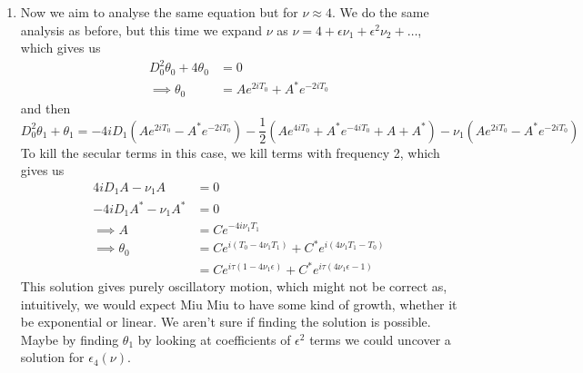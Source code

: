 \documentclass[12pt]{article}
\begin{document}
\begin{enumerate}
\begin{enumerate}
            \item Now we aim to analyse the same equation but for $\nu \approx 4$. We do the same 
            analysis as before, but this time we expand $\nu$ as $\nu = 4 + \epsilon\nu_1 + 
            \epsilon^2 \nu_2 + \dots$, which gives us
            \begin{equation*}
                \begin{split}
                    D_0^2\theta_0 + 4\theta_0 &= 0 \\
                    \implies \theta_0 &= Ae^{2iT_0}+A^*e^{-2iT_0}
                \end{split}
            \end{equation*}
            and then 
            \begin{equation*}
                D_0^2 \theta_1 +\theta_1 = -4iD_1(Ae^{2iT_0}-A^*e^{-2iT_0})-\frac{1}{2}(Ae^{4iT_0}
                +A^*e^{-4iT_0}+A+A^*)-\nu_1(Ae^{2iT_0}-A^*e^{-2iT_0})
            \end{equation*}
            To kill the secular terms in this case, we kill terms with frequency 2, which gives us 
            \begin{equation*}
                \begin{split}
                    4iD_1A-\nu_1A&=0 \\
                    -4iD_1A^*-\nu_1A^*&=0 \\
                    \implies A&=Ce^{-4i\nu_1T_1} \\
                    \implies \theta_0 &= Ce^{i(T_0-4\nu_1T_1)}+C^*e^{i(4\nu_1T_1-T_0)} \\
                    &= Ce^{i\tau(1-4\nu_1\epsilon)}+C^*e^{i\tau(4\nu_1\epsilon-1)}
                \end{split}
            \end{equation*}
            This solution gives purely oscillatory motion, which might not be correct as, intuitively, 
            we would expect Miu Miu to have some kind of growth, whether it be exponential or linear.
            We aren't sure if finding the solution is possible. Maybe by finding $\theta_1$ by looking 
            at coefficients of $\epsilon^2$ terms we could uncover a solution for $\epsilon_4(\nu)$.
            

        \end{enumerate}


\end{enumerate}
\end{document}
